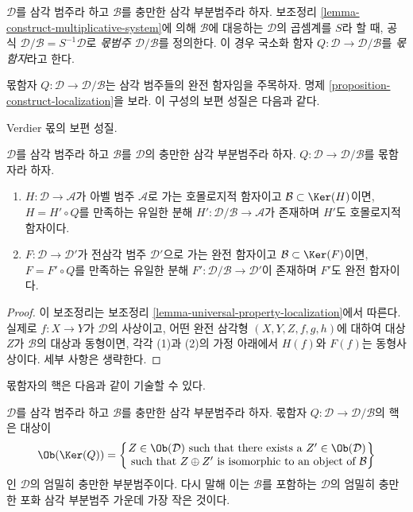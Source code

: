 \begin{definition}
\label{definition-quotient-category}
$\mathcal{D}$를 삼각 범주라 하고 $\mathcal{B}$를 충만한 삼각
부분범주라 하자. 보조정리
\ref{lemma-construct-multiplicative-system}에 의해 $\mathcal{B}$에
대응하는 $\mathcal{D}$의 곱셈계를 $S$라 할 때, 공식
$\mathcal{D}/\mathcal{B} = S^{-1}\mathcal{D}$로
{\it 몫범주 $\mathcal{D}/\mathcal{B}$}를 정의한다.
이 경우 국소화 함자 $Q : \mathcal{D} \to \mathcal{D}/\mathcal{B}$를
{\it 몫함자}라고 한다.
\end{definition}

\noindent
몫함자 $Q : \mathcal{D} \to \mathcal{D}/\mathcal{B}$는 삼각
범주들의 완전 함자임을 주목하자. 명제
\ref{proposition-construct-localization}을 보라.
이 구성의 보편 성질은 다음과 같다.

\begin{lemma}
\label{lemma-universal-property-quotient}
\begin{slogan}
Verdier 몫의 보편 성질.
\end{slogan}
$\mathcal{D}$를 삼각 범주라 하고 $\mathcal{B}$를 $\mathcal{D}$의
충만한 삼각 부분범주라 하자.
$Q : \mathcal{D} \to \mathcal{D}/\mathcal{B}$를 몫함자라 하자.
\begin{enumerate}
\item $H : \mathcal{D} \to \mathcal{A}$가 아벨 범주
$\mathcal{A}$로 가는 호몰로지적 함자이고
$\mathcal{B} \subset \Ker(H)$이면, $H = H' \circ Q$를 만족하는
유일한 분해 $H' : \mathcal{D}/\mathcal{B} \to \mathcal{A}$가
존재하며 $H'$도 호몰로지적 함자이다.
\item $F : \mathcal{D} \to \mathcal{D}'$가 전삼각 범주
$\mathcal{D}'$으로 가는 완전 함자이고
$\mathcal{B} \subset \Ker(F)$이면, $F = F' \circ Q$를 만족하는
유일한 분해 $F' : \mathcal{D}/\mathcal{B} \to \mathcal{D}'$이
존재하며 $F'$도 완전 함자이다.
\end{enumerate}
\end{lemma}

\begin{proof}
이 보조정리는 보조정리
\ref{lemma-universal-property-localization}에서 따른다.
실제로 $f : X \to Y$가 $\mathcal{D}$의 사상이고, 어떤 완전 삼각형
$(X, Y, Z, f, g, h)$에 대하여 대상 $Z$가 $\mathcal{B}$의 대상과
동형이면, 각각 (1)과 (2)의 가정 아래에서 $H(f)$와 $F(f)$는
동형사상이다. 세부 사항은 생략한다.
\end{proof}

\noindent
몫함자의 핵은 다음과 같이 기술할 수 있다.

\begin{lemma}
\label{lemma-kernel-quotient}
$\mathcal{D}$를 삼각 범주라 하고 $\mathcal{B}$를 충만한 삼각
부분범주라 하자. 몫함자
$Q : \mathcal{D} \to \mathcal{D}/\mathcal{B}$의 핵은 대상이
$$
\Ob(\Ker(Q)) =
\left\{
\begin{matrix}
Z \in \Ob(\mathcal{D})
\text{ such that there exists a }Z' \in \Ob(\mathcal{D}) \\
\text{ such that }Z \oplus Z'\text{ is isomorphic to an object of }\mathcal{B}
\end{matrix}
\right\}
$$
인 $\mathcal{D}$의 엄밀히 충만한 부분범주이다. 다시 말해 이는
$\mathcal{B}$를 포함하는 $\mathcal{D}$의 엄밀히 충만한 포화 삼각
부분범주 가운데 가장 작은 것이다.
\end{lemma}

